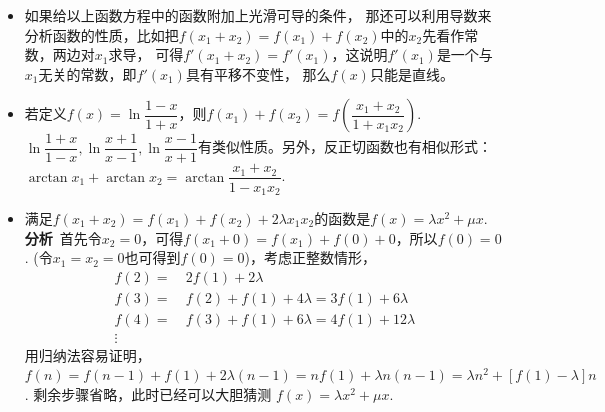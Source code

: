 \begin{itemize}[leftmargin=\inteval{\myitemleftmargin}pt,itemsep=
   \inteval{\myitemitempsep}pt,topsep=\inteval{\myitemtopsep}pt]
\item 如果给以上函数方程中的函数附加上光滑可导的条件，
那还可以利用导数来分析函数的性质，比如把$ f(x_1+x_2)=
f(x_1)+f(x_2) $中的$ x_2 $先看作常数，两边对$ x_1 $求导，
可得$ f'(x_1+x_2)=f'(x_1) $，这说明$ f'(x_1) $是一个与
$ x_1 $无关的常数，即$ f'(x_1) $具有平移不变性，
那么$ f(x) $只能是直线。

\item 若定义$ f(x)=\ln \dfrac{1-x}{1+x} $，则$ f(x_1)+f(x_2)=f\left(\dfrac{x_1+x_2}{1+x_1x_2} \right)  $. 
$ \ln \dfrac{1+x}{1-x},\ln \dfrac{x+1}{x-1},\ln \dfrac{x-1}{x+1}$有类似性质。另外，反正切函数也有相似形式：$ \arctan x_1+\arctan x_2=\arctan\dfrac{x_1+x_2}{1-x_1x_2} $. 

\item 满足$ f(x_1+x_2)= f(x_1)+f(x_2)+2\lambda x_1x_2 $的函数是$ f(x)=\lambda x^2+\mu x $. \\
\textbf{分析}\ 首先令$ x_2=0 $，可得$ f(x_1+0)=f(x_1)+f(0)+0 $，所以$ f(0)=0 $.
(令$ x_1=x_2=0 $也可得到$ f(0)=0 $)，考虑正整数情形，
\begin{align*}
    f(2)=&\ 2f(1)+2\lambda \\
    f(3)=&\ f(2)+f(1)+4\lambda=3f(1)+6 \lambda \\
    f(4)=&\ f(3)+f(1)+6\lambda=4f(1)+12\lambda \\
    \vdots&\  
\end{align*}
用归纳法容易证明，$ f(n)=f(n-1)+f(1)+2\lambda (n-1)=nf(1)+\lambda n(n-1)=
\lambda n^2+[f(1)-\lambda]n $. 剩余步骤省略，此时已经可以大胆猜测
$ f(x)=\lambda x^2+\mu x $. 


\end{itemize}

